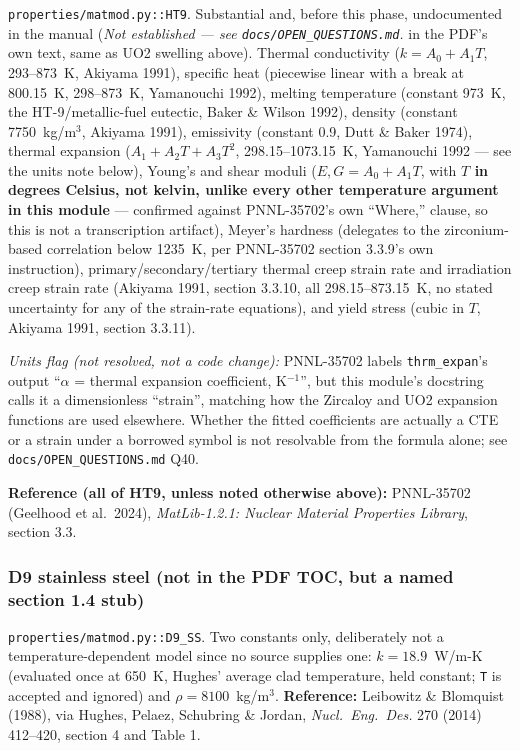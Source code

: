 \documentclass[11pt]{article}
\newcommand{\code}[1]{\texttt{#1}}
\newcommand{\notest}{\textit{Not established --- see \code{docs/OPEN\_QUESTIONS.md}.}}
\begin{document}
\code{properties/matmod.py::HT9}. Substantial and, before this phase, undocumented in
the manual (\notest{} in the PDF's own text, same as UO2 swelling above). Thermal
conductivity ($k=A_0+A_1T$, 293--873~K, Akiyama 1991), specific heat (piecewise linear
with a break at 800.15~K, 298--873~K, Yamanouchi 1992), melting temperature (constant
973~K, the HT-9/metallic-fuel eutectic, Baker \& Wilson 1992), density (constant
7750~kg/m$^3$, Akiyama 1991), emissivity (constant 0.9, Dutt \& Baker 1974), thermal
expansion ($A_1+A_2T+A_3T^2$, 298.15--1073.15~K, Yamanouchi 1992 --- see the units note
below), Young's and shear moduli ($E,G = A_0+A_1T$, with \textbf{$T$ in degrees Celsius,
not kelvin, unlike every other temperature argument in this module} --- confirmed
against PNNL-35702's own ``Where,'' clause, so this is not a transcription artifact),
Meyer's hardness (delegates to the zirconium-based correlation below 1235~K, per
PNNL-35702 section 3.3.9's own instruction), primary/secondary/tertiary thermal creep
strain rate and irradiation creep strain rate (Akiyama 1991, section 3.3.10, all
298.15--873.15~K, no stated uncertainty for any of the strain-rate equations), and
yield stress (cubic in $T$, Akiyama 1991, section 3.3.11).

\textit{Units flag (not resolved, not a code change):} PNNL-35702 labels
\code{thrm\_expan}'s output ``$\alpha$ = thermal expansion coefficient, K$^{-1}$'', but
this module's docstring calls it a dimensionless ``strain'', matching how the
Zircaloy and UO2 expansion functions are used elsewhere. Whether the fitted
coefficients are actually a CTE or a strain under a borrowed symbol is not resolvable
from the formula alone; see \code{docs/OPEN\_QUESTIONS.md} Q40.

\textbf{Reference (all of HT9, unless noted otherwise above):} PNNL-35702 (Geelhood et
al.\ 2024), \emph{MatLib-1.2.1: Nuclear Material Properties Library}, section 3.3.

\subsubsection*{D9 stainless steel (not in the PDF TOC, but a named section 1.4 stub)}

\code{properties/matmod.py::D9\_SS}. Two constants only, deliberately not a
temperature-dependent model since no source supplies one: $k=18.9$~W/m-K (evaluated
once at 650~K, Hughes' average clad temperature, held constant; \code{T} is accepted
and ignored) and $\rho=8100$~kg/m$^3$. \textbf{Reference:} Leibowitz \& Blomquist
(1988), via Hughes, Pelaez, Schubring \& Jordan, \emph{Nucl.\ Eng.\ Des.} 270 (2014)
412--420, section 4 and Table 1.
\end{document}
